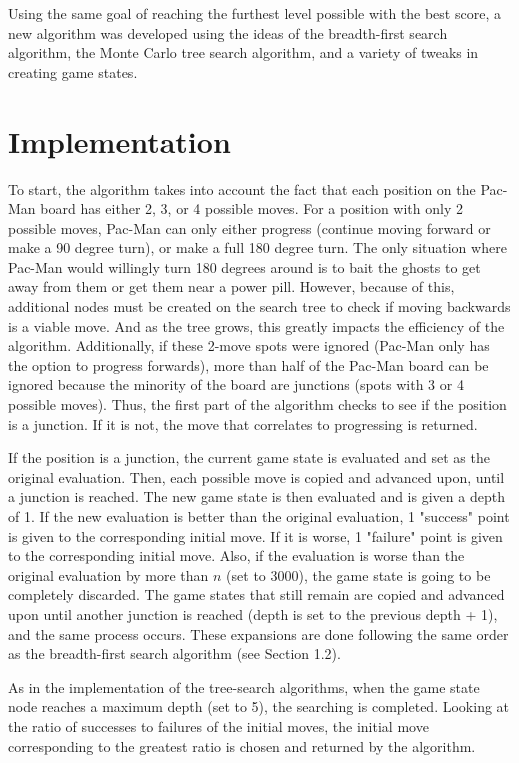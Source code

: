 \documentclass[a4paper,oneside,10pt]{report}
\begin{document}
Using the same goal of reaching the furthest level possible with the best score, a new algorithm was developed using the ideas of the breadth-first search algorithm, the Monte Carlo tree search algorithm, and a variety of tweaks in creating game states. 

\section {Implementation} \label{custImp}

To start, the algorithm takes into account the fact that each position on the Pac-Man board has either 2, 3, or 4 possible moves. For a position with only 2 possible moves, Pac-Man can only either progress (continue moving forward or make a 90 degree turn), or make a full 180 degree turn. The only situation where Pac-Man would willingly turn 180 degrees around is to bait the ghosts to get away from them or get them near a power pill. However, because of this, additional nodes must be created on the search tree to check if moving backwards is a viable move. And as the tree grows, this greatly impacts the efficiency of the algorithm. Additionally, if these 2-move spots were ignored (Pac-Man only has the option to progress forwards), more than half of the Pac-Man board can be ignored because the minority of the board are junctions (spots with 3 or 4 possible moves). Thus, the first part of the algorithm checks to see if the position is a junction. If it is not, the move that correlates to progressing is returned.

If the position is a junction, the current game state is evaluated and set as the original evaluation. Then, each possible move is copied and advanced upon, until a junction is reached. The new game state is then evaluated and is given a depth of 1. If the new evaluation is better than the original evaluation, 1 "success" point is given to the corresponding initial move. If it is worse, 1 "failure" point is given to the corresponding initial move. Also, if the evaluation is worse than the original evaluation by more than $n$ (set to 3000), the game state is going to be completely discarded. The game states that still remain are copied and advanced upon until another junction is reached (depth is set to the previous depth + 1), and the same process occurs. These expansions are done following the same order as the breadth-first search algorithm (see Section 1.2). 

As in the implementation of the tree-search algorithms, when the game state node reaches a maximum depth (set to 5), the searching is completed. Looking at the ratio of successes to failures of the initial moves, the initial move corresponding to the greatest ratio is chosen and returned by the algorithm.
\end{document}
